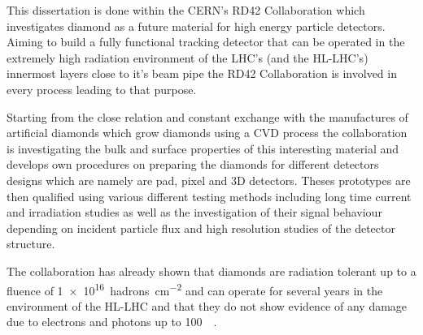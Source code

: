 
This dissertation is done within the CERN's RD42 Collaboration which investigates diamond as a future material for high energy particle detectors. Aiming to build a fully functional tracking detector that can be operated in the extremely high radiation environment of the LHC's (and the HL-LHC's) innermost layers close to it's beam pipe the RD42 Collaboration is involved in every process leading to that purpose.\par
Starting from the close relation and constant exchange with the manufactures of artificial diamonds which grow diamonds using a \ac{CVD} process the collaboration is investigating the bulk and surface properties of this interesting material and develops own procedures on preparing the diamonds for different detectors designs which are namely are pad, pixel and 3D detectors. Theses prototypes are then qualified using various different testing methods including long time current and irradiation studies as well as the investigation of their signal behaviour depending on incident particle flux and high resolution studies of the detector structure.\par
The collaboration has already shown that diamonds are radiation tolerant up to a fluence of \SI{1e16}{hadrons\per\centi\meter^2} and can operate for several years in the environment of the HL-LHC and that they do not show evidence of any damage due to electrons and photons up to \SI{100}{\mega\rad}.\parend